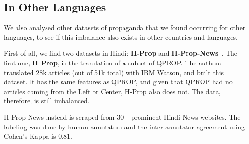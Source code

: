 
\subsection{In Other Languages}

We also analysed other datasets of propaganda that we found occurring for other languages, to see if this imbalance also exists in other countries and languages.


First of all, we find two datasets in Hindi: \textbf{H-Prop} and \textbf{H-Prop-News}~\citep{chaudhari2022h,chaudhari_deptii_2022_5828240}.
The first one, \textbf{H-Prop}, is the translation of a subset of QPROP. The authors translated 28k articles (out of 51k total) with IBM Watson, and built this dataset. It has the same features as QPROP, and given that QPROP had no articles coming from the Left or Center, H-Prop also does not. The data, therefore, is still imbalanced.

H-Prop-News instead is scraped from 30+ prominent Hindi News websites. The labeling was done by human annotators and the inter-annotator agreement using Cohen’s Kappa is 0.81.

